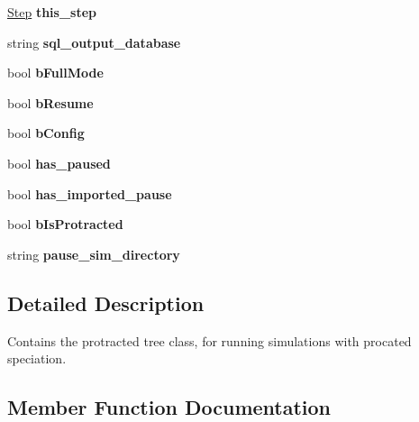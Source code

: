 \begin{DoxyCompactItemize}
\item 
\hyperlink{struct_step}{Step} {\bfseries this\+\_\+step}\hypertarget{class_tree_af7de4d4f04360edcbe2a20db882b1f87}{}\label{class_tree_af7de4d4f04360edcbe2a20db882b1f87}

\item 
string {\bfseries sql\+\_\+output\+\_\+database}\hypertarget{class_tree_a80d3e92108eb472df49640a661ef4f7d}{}\label{class_tree_a80d3e92108eb472df49640a661ef4f7d}

\item 
bool {\bfseries b\+Full\+Mode}\hypertarget{class_tree_a7a32ee0d04641ae745c08f7278c36c13}{}\label{class_tree_a7a32ee0d04641ae745c08f7278c36c13}

\item 
bool {\bfseries b\+Resume}\hypertarget{class_tree_ac9cbd7d17fb511c1fcc70c765f6440b0}{}\label{class_tree_ac9cbd7d17fb511c1fcc70c765f6440b0}

\item 
bool {\bfseries b\+Config}\hypertarget{class_tree_a6c8c76aec6a9faef9c38f4f275b0793d}{}\label{class_tree_a6c8c76aec6a9faef9c38f4f275b0793d}

\item 
bool {\bfseries has\+\_\+paused}\hypertarget{class_tree_aaa64e29ab7bc3c6f48d454063f0c39e1}{}\label{class_tree_aaa64e29ab7bc3c6f48d454063f0c39e1}

\item 
bool {\bfseries has\+\_\+imported\+\_\+pause}\hypertarget{class_tree_ad8d1d7e4fa673b28542ba31c5b637856}{}\label{class_tree_ad8d1d7e4fa673b28542ba31c5b637856}

\item 
bool {\bfseries b\+Is\+Protracted}\hypertarget{class_tree_a1f7515f16d99a9748ab2c4c667f1ffc4}{}\label{class_tree_a1f7515f16d99a9748ab2c4c667f1ffc4}

\item 
string {\bfseries pause\+\_\+sim\+\_\+directory}\hypertarget{class_tree_a504a4d7ae23146fd6236baa59da51a6e}{}\label{class_tree_a504a4d7ae23146fd6236baa59da51a6e}

\end{DoxyCompactItemize}


\subsection{Detailed Description}
Contains the protracted tree class, for running simulations with procated speciation. 

\subsection{Member Function Documentation}
